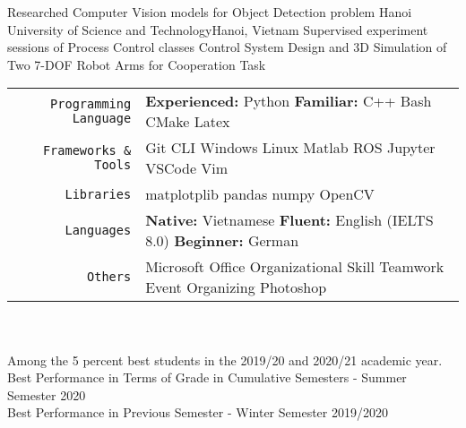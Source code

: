 \documentclass[
10pt,
A4,
english,
draft = false,
twoside = false,
]{article}
\begin{document}
	{Researched Computer Vision models for Object Detection problem}
	{Hanoi University of Science and Technology}{Hanoi, Vietnam}
	{Supervised experiment sessions of Process Control classes}
	{Control System Design and 3D Simulation of Two 7-DOF Robot Arms for Cooperation Task}
	\tab \begin{tabular}{r p{}}
		\texttt{\large Programming Language} & \textbf{Experienced:} Python \tab \textbf{Familiar:} C++ \cvContactSep Bash \cvContactSep CMake \cvContactSep Latex\\
		\texttt{\large Frameworks \& Tools} & Git \cvContactSep CLI \cvContactSep Windows \cvContactSep Linux \cvContactSep Matlab \cvContactSep ROS \cvContactSep Jupyter \cvContactSep VSCode \cvContactSep Vim \\
		\texttt{\large Libraries} & matplotplib \cvContactSep pandas \cvContactSep numpy \cvContactSep OpenCV\\
		\texttt{\large Languages} & \textbf{Native:} Vietnamese \cvContactSep \textbf{Fluent:} English (IELTS 8.0) \cvContactSep \textbf{Beginner:} German \\
		\texttt{\large Others} & Microsoft Office \cvContactSep Organizational Skill \cvContactSep Teamwork \cvContactSep Event Organizing \cvContactSep Photoshop
	\end{tabular}\\~\\
	{Among the 5 percent best students in the 2019/20 and 2020/21 academic year.}
	{Best Performance in Terms of Grade in Cumulative Semesters - Summer Semester 2020\\
	Best Performance in Previous Semester - Winter Semester 2019/2020}
\end{document}
